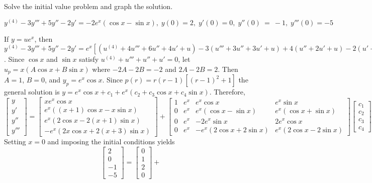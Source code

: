 \documentclass{ximera}
\begin{document}
\begin{problem}\label{exer:9.3.74}  Solve the initial value problem and graph the solution.

$y^{(4)}-3y'''+5y''-2y'=-2e^x(\cos x-\sin
x),\; y(0)=2,\; y'(0)=0,\; y''(0)~=~-1, \; y'''(0)=-5$

\begin{solution}
If $y=ue^x$, then $y^{(4)}-3y'''+5y''-2y'=e^x[
(u^{(4)}+4u'''+6u''+4u'+u) -3(u'''+3u''+3u'+u) +4(u''+2u'+u) -2(u'+u)
]=e^x(u^{(4)}+u'''+u''+u')$. Since $\cos x$ and $\sin x$
satisfy $u^{(4)}+u'''+u''+u'=0$, let $u_p=x(A\cos x+B\sin x)$
where $-2A-2B=-2$ and $2A-2B=2$. Then $A=1$, $B=0$, and $y_p=e^x\cos
x$. Since $p(r)=r(r-1)[(r-1)^2+1]$ the general solution is
$y=e^x\cos x+c_1+e^x(c_2+c_3\cos x+c_4\sin x)$.
 Therefore,
$$
\left[\begin{array}{l}y\\y'\\y''\\y'''\end{array}\right]=
\left[\begin{array}{c}
xe^x\cos x\\
e^x((x+1)\cos x-x\sin x)\\
e^x(2\cos x-2(x+1)\sin x)\\
-e^x(2x\cos x+2(x+3)\sin x)
\end{array}\right]+
\left[\begin{array}{cccc}1&e^x&e^x\cos x&e^x\sin x\\
0&e^x&e^x(\cos x-\sin x)&e^x(\cos x+\sin x)
\\0&e^x&-2e^x\sin x&2e^x\cos x\\0&e^x&-e^x(2\cos x+2\sin x)
&e^x(2\cos x-2\sin x)\end{array}\right]
\left[\begin{array}{c}
c_1\\c_2\\c_3\\c_4
\end{array}\right]
$$
Setting $x=0$ and imposing the initial conditions yields
$$
\left[\begin{array}{r}
2\\0\\-1\\-5
\end{array}\right]=
\left[\begin{array}{r}
0\\1\\2\\0
\end{array}\right]+
$$
\end{solution}
\end{problem}
\end{document}
